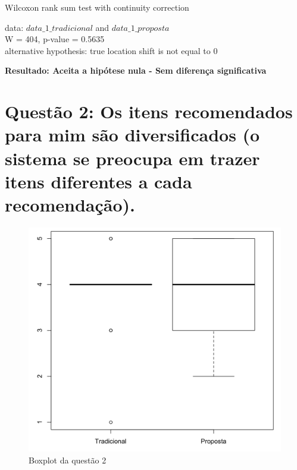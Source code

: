Wilcoxon rank sum test with continuity correction

\noindent
data:  $data\_1\_tradicional$ and $data\_1\_proposta$\\
W = 404, p-value = 0.5635\\
alternative hypothesis: true location shift is not equal to 0

\noindent
\textbf{Resultado: Aceita a hipótese nula - Sem diferença significativa}

\newpage
\section{Questão 2: Os itens recomendados para mim são diversificados (o sistema se preocupa em trazer itens diferentes a cada recomendação).}

\begin{figure}[htb]
  \caption{\label{fig:questao2-boxplot}Boxplot da questão 2}
  \begin{center}
      \includegraphics[scale=0.4]{./Figuras/questao2-boxplot.png}
  \end{center}
\end{figure}

